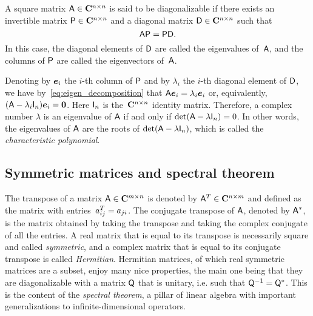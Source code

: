 \begin{definition}
    \label{definition:diagonalizable}
    A square matrix $\mathsf A \in \mathbf C^{n \times n}$ is said to be diagonalizable if there exists an invertible matrix $\mathsf P \in \mathbf C^{n \times n}$
    and a diagonal matrix $\mathsf D \in \mathbf C^{n \times n}$ such that
    \begin{equation}
        \label{eq:eigen_decomposition}
        \mathsf A \mathsf P = \mathsf P \mathsf D.
    \end{equation}
    In this case,
    the diagonal elements of $\mathsf D$ are called the eigenvalues of~$\mathsf A$,
    and the columns of $\mathsf P$ are called the eigenvectors of~$\mathsf A$.
\end{definition}
Denoting by $\mathbf{\boldsymbol{e}}_i$ the $i$-th column of $\mathsf P$ and by $\lambda_i$ the $i$-th diagonal element of $\mathsf D$,
we have by~\eqref{eq:eigen_decomposition} that $\mathsf A \mathbf{\boldsymbol{e}}_i = \lambda_i \mathbf{\boldsymbol{e}}_i$ or,
equivalently, $(\mathsf A - \lambda_i \mathsf I_n) \mathbf{\boldsymbol{e}}_i = \mathbf{\boldsymbol{0}}$.
Here $\mathsf I_n$ is the~$\mathbf C^{n \times n}$ identity matrix.
Therefore, a complex number $\lambda$ is an eigenvalue of $\mathsf A$ if and only if $\det(\mathsf A - \lambda \mathsf I_n) = 0$.
In other words, the eigenvalues of $\mathsf A$ are the roots of $\det(\mathsf A - \lambda \mathsf I_n)$,
which is called the \emph{characteristic polynomial}.

\subsection*{Symmetric matrices and spectral theorem}%
The transpose of a matrix $\mathsf A \in \mathbf C^{m \times n}$ is denoted by $\mathsf A^T \in \mathbf C^{n \times m}$
and defined as the matrix with entries~$a^T_{ij} = a_{ji}$.
The conjugate transpose of $\mathsf A$, denoted by $\mathsf A^*$,
is the matrix obtained by taking the transpose and taking the complex conjugate of all the entries.
A real matrix that is equal to its transpose is necessarily square and called \emph{symmetric},
and a complex matrix that is equal to its conjugate transpose is called \emph{Hermitian}.
Hermitian matrices, of which real symmetric matrices are a subset,
enjoy many nice properties,
the main one being that they are diagonalizable with a matrix $\mathsf Q$ that is unitary,
i.e. such that $\mathsf Q^{-1} = \mathsf Q^*$.
This is the content of the \emph{spectral theorem},
a pillar of linear algebra with important generalizations to infinite-dimensional operators.

